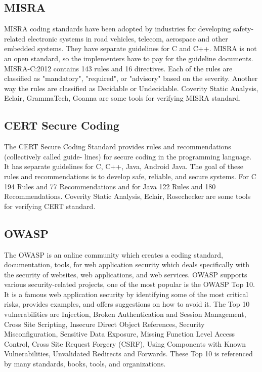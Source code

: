  \subsection{MISRA}
 MISRA\cite{misra} coding standards have been adopted by industries for developing safety-related electronic systems in road vehicles, telecom, aerospace and other embedded systems. They have separate guidelines for C and C++.  MISRA is not an open standard, so the implementers have to pay for the guideline documents. MISRA-C:2012 contains 143 rules and 16 directives. Each of the rules are classified as "mandatory", "required", or "advisory" based on the severity. Another way the rules are classified as Decidable or Undecidable. Coverity Static Analysis, Eclair, GrammaTech, Goanna are some tools for verifying MISRA standard.
 
 
  \subsection{CERT Secure Coding}
 The CERT\cite{cert-c} Secure Coding Standard provides rules and recommendations (collectively called guide-
 lines) for secure coding in the programming language. It has separate guidelines for C, C++, Java, Android Java. The goal of these rules and recommendations is to develop safe, reliable, and secure systems. For C 194 Rules and 77 Recommendations and for Java 122 Rules and 180 Recommendations. Coverity Static Analysis, Eclair, Rosechecker are some tools for verifying CERT standard.
 
 \subsection{OWASP}
 The OWASP is an online community which creates a coding standard, documentation, tools, for web application security which deals specifically with the security of websites, web applications, and web services. OWASP supports various security-related projects, one of the most popular is the OWASP Top 10. It is a famous web application security by identifying some of the most critical risks, provides examples, and offers suggestions on how to avoid it. The Top 10 vulnerabilities are Injection, Broken Authentication and Session Management, Cross Site Scripting, Insecure Direct Object References, Security Misconfiguration, Sensitive Data Exposure, Missing Function Level Access Control, Cross Site Request Forgery (CSRF), Using Components with Known Vulnerabilities, Unvalidated Redirects and Forwards. These Top 10 is referenced by many standards, books, tools, and organizations.
